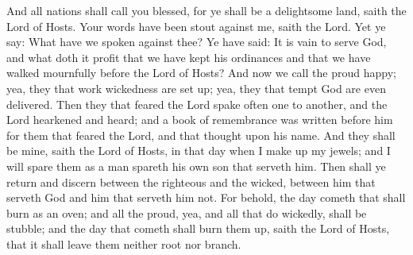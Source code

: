 \bverse \iffalse And all nations shall call you blessed, for ye shall be a delightsome land, saith the Lord of Hosts. \fi
And all nations shall call you blessed, for ye shall be a delightsome land, saith the Lord of Hosts.
\bverse \iffalse Your words have been stout against me, saith the Lord. Yet ye say: What have we spoken against thee? \fi
Your words have been stout against me, saith the Lord. Yet ye say: What have we spoken against thee?
\bverse \iffalse Ye have said: It is vain to serve God, and what doth it profit that we have kept his ordinances and that we have walked mournfully before the Lord of Hosts? \fi
Ye have said: It is vain to serve God, and what doth it profit that we have kept his ordinances and that we have walked mournfully before the Lord of Hosts?
\bverse \iffalse And now we call the proud happy; yea, they that work wickedness are set up; yea, they that tempt God are even delivered. \fi
And now we call the proud happy; yea, they that work wickedness are set up; yea, they that tempt God are even delivered.
\bverse \iffalse Then they that feared the Lord spake often one to another, and the Lord hearkened and heard; and a book of remembrance was written before him for them that feared the Lord, and that thought upon his name. \fi
Then they that feared the Lord spake often one to another, and the Lord hearkened and heard; and a book of remembrance was written before him for them that feared the Lord, and that thought upon his name.
\bverse \iffalse And they shall be mine, saith the Lord of Hosts, in that day when I make up my jewels; and I will spare them as a man spareth his own son that serveth him. \fi
And they shall be mine, saith the Lord of Hosts, in that day when I make up my jewels; and I will spare them as a man spareth his own son that serveth him.
\bverse \iffalse Then shall ye return and discern between the righteous and the wicked, between him that serveth God and him that serveth him not. \fi
Then shall ye return and discern between the righteous and the wicked, between him that serveth God and him that serveth him not.
\bchapter
\bverse \iffalse For behold, the day cometh that shall burn as an oven; and all the proud, yea, and all that do wickedly, shall be stubble; and the day that cometh shall burn them up, saith the Lord of Hosts, that it shall leave them neither root nor branch. \fi
For behold, the day cometh that shall burn as an oven; and all the proud, yea, and all that do wickedly, shall be stubble; and the day that cometh shall burn them up, saith the Lord of Hosts, that it shall leave them neither root nor branch.
